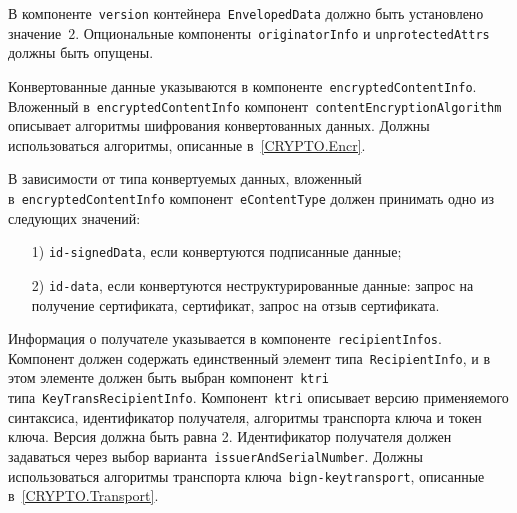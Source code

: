 В компоненте~\texttt{version} контейнера~\texttt{EnvelopedData} 
должно быть установлено значение~$2$. Опциональные 
компоненты~\texttt{originatorInfo} и \texttt{unprotectedAttrs} должны быть 
опущены. 

Конвертованные данные указываются в компоненте~\texttt{encryptedContentInfo}.
%
Вложенный в~\texttt{encryptedContentInfo} компонент~\texttt{contentEncryptionAlgorithm}
описывает алгоритмы шифрования конвертованных данных. Должны использоваться алгоритмы, 
описанные в~\ref{CRYPTO.Encr}.

В зависимости от типа конвертуемых данных, вложенный 
в~\texttt{encryptedContentInfo} компонент~\texttt{eContentType} 
должен принимать одно из следующих значений:
\begin{enumerate}
\item[1)]
\texttt{id-signedData}, если конвертуются подписанные данные;
\item[2)]
\texttt{id-data}, если конвертуются неструктурированные данные:
запрос на получение сертификата, сертификат, запрос на отзыв сертификата.
\end{enumerate}

Информация о получателе указывается в компоненте~\texttt{recipientInfos}.
Компонент должен содержать единственный элемент 
типа~\texttt{RecipientInfo}, и в этом элементе должен быть выбран  
компонент~\texttt{ktri} типа~\texttt{KeyTransRecipientInfo}.  
Компонент~\texttt{ktri} описывает версию применяемого синтаксиса, 
идентификатор получателя, алгоритмы транспорта ключа и токен ключа. 
Версия должна быть равна 2. Идентификатор получателя должен 
задаваться через выбор варианта~\texttt{issuerAndSerialNumber}. 
Должны использоваться алгоритмы транспорта 
ключа~\texttt{bign-keytransport}, описанные в~\ref{CRYPTO.Transport}.

